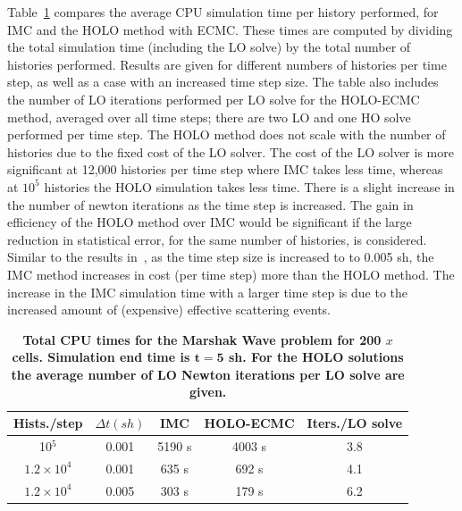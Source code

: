 \documentclass{mc2013}
\begin{document}
Table~\ref{marshak_table} compares the average CPU simulation time per history performed, for IMC and the HOLO method
with ECMC.  These times are computed by dividing the total simulation time (including
the LO solve) by the total number of histories performed.  Results are given for different numbers of histories per time step, as
well as a case with an increased time step size.  The table also includes the number of LO
iterations performed per LO solve for the HOLO-ECMC method, averaged over all time steps; there are two LO and
one HO solve performed per time step.    The HOLO method does not scale with the number of
histories due to the fixed cost of the LO solver.  The cost of the LO solver is more
significant at 12,000 histories per time step where IMC takes less time, whereas at
$10^5$ histories the HOLO simulation takes less time. There is a slight increase in the number of
newton iterations as the time step is increased.   The gain in efficiency of
the HOLO method over IMC would be significant if the large reduction in statistical
error, for the same number of histories, is considered.  Similar to the results
in~\cite{park}, as the time step size is increased to to 0.005 sh, the IMC method
increases in cost (per time step) more than the HOLO method. The increase in the IMC
simulation time with a larger time step is due to the increased amount of (expensive) effective scattering
events.   
\begin{table}[H]
\centering
\caption{\label{marshak_table} \textbf{Total CPU times for the Marshak Wave problem
    for 200 $x$ cells.  Simulation end time is $\mathbf{t=5}$ sh. For the HOLO
    solutions the average number of LO Newton iterations per LO solve are given. }}
\vspace{-0.1in}
	\begin{tabular}{|cc|c|cc|}\hline
Hists./step & $\Delta t (sh)$ & IMC & HOLO-ECMC & Iters./LO solve \\ \hline
10$^5$                    &   0.001	& 5190 s &	4003 s & 3.8               \\
$1.2\times10^4 $   &    0.001	& 635   s &	   692 s   & 4.1               \\
$1.2\times10^4$     &   0.005	& 303   s &    179 s   & 6.2                \\ \hline
\end{tabular}
\end{table}
\end{document}
